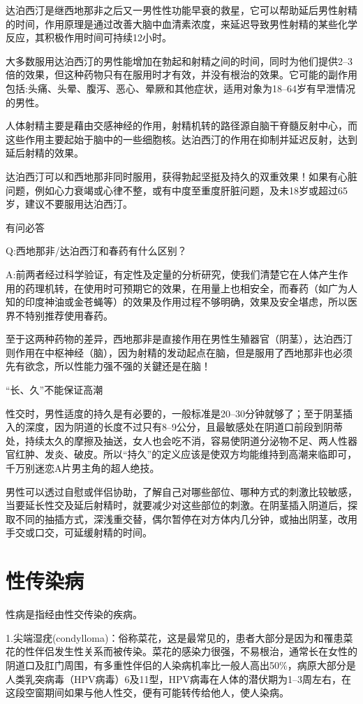 \documentclass[12pt,UTF8]{ctexbook}
\begin{document}
达泊西汀是继西地那非之后又一男性性功能早衰的救星，它可以帮助延后男性射精的时间，作用原理是通过改善大脑中血清素浓度，来延迟导致男性射精的某些化学反应，其积极作用时间可持续12小时。

大多数服用达泊西汀的男性能增加在勃起和射精之间的时间，同时为他们提供2--3倍的效果，但这种药物只有在服用时才有效，并没有根治的效果。它可能的副作用包括:头痛、头晕、腹泻、恶心、晕厥和其他症状，适用对象为18--64岁有早泄情况的男性。

人体射精主要是藉由交感神经的作用，射精机转的路径源自脑干脊髓反射中心，而这些作用主要起始于脑中的一些细胞核。达泊西汀的作用在抑制并延迟反射，达到延后射精的效果。

达泊西汀可以和西地那非同时服用，获得勃起坚挺及持久的双重效果！如果有心脏问题，例如心力衰竭或心律不整，或有中度至重度肝脏问题，及未18岁或超过65岁，建议不要服用达泊西汀。

有问必答

Q:西地那非/达泊西汀和春药有什么区别？

A:前两者经过科学验证，有定性及定量的分析研究，使我们清楚它在人体产生作用的药理机转，在使用时可预期它的效果，在用量上也相安全，而春药（如广为人知的印度神油或金苍蝇等）的效果及作用过程不够明确，效果及安全堪虑，所以医界不特别推荐使用春药。

至于这两种药物的差异，西地那非是直接作用在男性生殖器官（阴茎），达泊西汀则作用在中枢神经（脑），因为射精的发动起点在脑，但是服用了西地那非也必须先有欲念，所以性能力强不强的关鍵还是在脑！

“长、久”不能保证高潮

性交时，男性适度的持久是有必要的，一般标准是20--30分钟就够了；至于阴茎插入的深度，因为阴道的长度不过只有8--9公分，且最敏感处在阴道口前段到阴蒂处，持续太久的摩擦及抽送，女人也会吃不消，容易使阴道分泌物不足、两人性器官红肿、发炎、破皮。所以“持久”的定义应该是使双方均能维持到高潮来临即可，千万别迷恋A片男主角的超人绝技。

男性可以透过自慰或伴侣协助，了解自己对哪些部位、哪种方式的刺激比较敏感，当要延长性交及延后射精时，就要减少对这些部位的刺激。在阴茎插入阴道后，探取不同的抽插方式，深浅重交替，偶尔暂停在对方体内几分钟，或抽出阴茎，改用手交或口交，可延缓射精的时间。

\part{性传染病}

性病是指经由性交传染的疾病。

1.尖端湿疣(condylloma)：俗称菜花，这是最常见的，患者大部分是因为和罹患菜花的性伴侣发生性关系而被传染。菜花的感染力很强，不易根治，通常长在女性的阴道口及肛门周围，有多重性伴侣的人染病机率比一般人高出50\%，病原大部分是人类乳突病毒（HPV病毒）6及11型，HPV病毒在人体的潜伏期为1--3周左右，在这段空窗期间如果与他人性交，便有可能转传给他人，使人染病。
\end{document}
